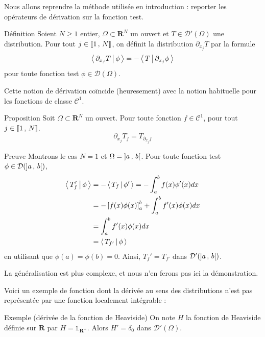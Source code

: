         Nous allons reprendre la méthode utilisée en introduction : reporter les opérateurs de dérivation sur la fonction test. 

        \begin{omed}{Définition}
            Soient $N \geq 1$ entier, $\Omega \subset \mathbf{R}^N$ un ouvert et $T \in \mathcal{D}'(\Omega)$ une distribution. Pour tout $j \in \left[\!\left[ 1 \, , \, N \right]\!\right]$, on définit la distribution $\partial_{x_j} T$ par la formule 
            \[ \left< \, \partial_{x_j} T \, \middle| \, \phi \, \right> = - \left< \, T \, \middle| \, \partial_{x_j} \phi \, \right> \]   
            pour toute fonction test $\phi \in \mathcal{D}(\Omega)$. 
        \end{omed}

        Cette notion de dérivation coïncide (heuresement) avec la notion habituelle pour les fonctions de classe $\mathcal{C}^1$.

        \begin{omed}{Proposition}
            Soit $\Omega \subset \mathbf{R}^N$ un ouvert. Pour toute fonction $f \in \mathcal{C}^1$, pour tout $j \in \left[\!\left[ 1 \, , \, N \right]\!\right]$.
            \[ \partial_{x_j} T_f = T_{\partial_{x_j} f} \]   
        \end{omed}

        \begin{demo}{Preuve}
            Montrons le cas $N = 1$ et $\Omega = \left] a \, , \, b \right[$. Pour toute fonction test $\phi \in \mathcal{D}(\left] a \, , \, b \right[)$, 
            \begin{align*}
                \left< \, T'_f \, \middle| \, \phi \, \right> 
                &= -\left< \, T_f \, \middle| \, \phi' \, \right> = - \int_{a}^b f(x) \phi'(x)dx \\
                &= -\left[f(x) \phi(x)\right]_{a}^b + \int_{a}^{b}f'(x)\phi(x) dx \\
                &= \int_{a}^{b} f'(x) \phi(x) dx \\
                &= \left< \, T_{f'} \, \middle| \, \phi \, \right>
            \end{align*}
            en utilisant que $\phi(a) = \phi(b) = 0$. Ainsi, $T_f' = T_{f'}$ dans $\mathcal{D}'(\left] a \, , \, b \right[)$. 

            La généralisation est plus complexe, et nous n’en ferons pas ici la démonstration.
        \end{demo}

        Voici un exemple de fonction dont la dérivée au sens des distributions n’est pas représentée par une fonction localement intégrable :

        \begin{demo}{Exemple (dérivée de la fonction de Heaviside)}
            On note $H$ la fonction de Heaviside définie sur $\mathbf{R}$ par $H = \mathbb{1}_{\mathbf{R}^+}$. Alors $H' = \delta_0$ dans $\mathcal{D}'(\Omega)$.
        \end{demo}

